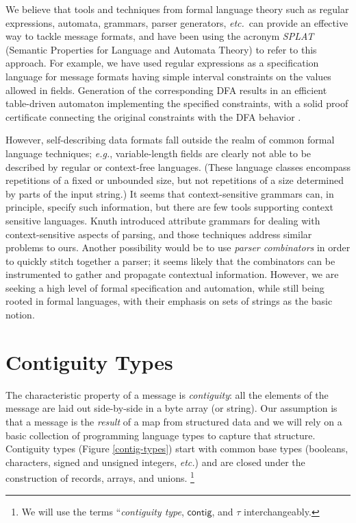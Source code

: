 \documentclass[a4paper,UKenglish,cleveref, autoref, thm-restate]{lipics-v2021}
\newcommand{\eg}{\textit{e.g.}}
\newcommand{\etc}{\textit{etc.}}
\newcommand{\konst}[1]{\ensuremath{\mathsf{#1}}}
\begin{document}
We believe that tools and techniques from formal language theory such
as regular expressions, automata, grammars, parser generators, \etc\,
can provide an effective way to tackle message formats, and have been
using the acronym \emph{SPLAT} (Semantic Properties for Language and
Automata Theory) to refer to this approach. For example, we have used
regular expressions as a specification language for message formats
having simple interval constraints on the values allowed in
fields. Generation of the corresponding DFA results in an efficient
table-driven automaton implementing the specified constraints, with a
solid proof certificate connecting the original constraints with the
DFA behavior \cite{hardin-slind-safecomp-2016}.

However, self-describing data formats fall outside the realm of common
formal language techniques; \eg, variable-length fields are clearly
not able to be described by regular or context-free languages. (These
language classes encompass repetitions of a fixed or unbounded size,
but not repetitions of a size determined by parts of the input
string.) It seems that context-sensitive grammars can, in principle,
specify such information, but there are few tools supporting context
sensitive languages. Knuth introduced attribute grammars
\cite{knuth-attribute-grammars} for dealing with context-sensitive
aspects of parsing, and those techniques address similar problems to
ours. Another possibility would be to use \emph{parser combinators} in
order to quickly stitch together a parser; it seems likely that the
combinators can be instrumented to gather and propagate contextual
information. However, we are seeking a high level of formal
specification and automation, while still being rooted in formal
languages, with their emphasis on sets of strings as the basic notion.

\section {Contiguity Types}

The characteristic property of a message is \emph{contiguity}: all the
elements of the message are laid out side-by-side in a byte array (or
string). Our assumption is that a message is the \emph{result} of a
map from structured data and we will rely on a basic collection of
programming language types to capture that structure. Contiguity types
(Figure \ref{contig-types}) start with common base types (booleans,
characters, signed and unsigned integers, \etc) and are closed under
the construction of records, arrays, and unions. \footnote{We will use
the terms ``\emph{contiguity type}, \konst{contig}, and $\tau$
interchangeably.}
\end{document}
